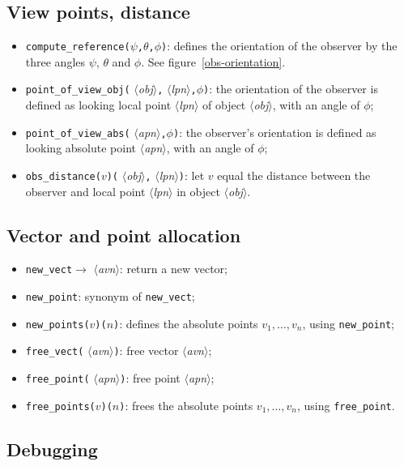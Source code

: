 \documentclass[nonumber,harvardcite]{ltugboat}
\DeclareRobustCommand\meta[1]{%
       \ensuremath{\langle}\emph{#1}\ensuremath{\rangle}}
\newcommand{\AVN}{\meta{avn}}
\newcommand{\APN}{\meta{apn}}
\newcommand{\LPN}{\meta{lpn}}
\newcommand{\IN}{\meta{obj}}
\newcommand{\tc}{\texttt{,}}
\begin{document}
\break

\subsection{View points, distance}

\begin{itemize}
\item \verb|compute_reference(|$\psi$\tc$\theta$\tc$\phi$\verb|)|: defines
the orientation of the observer by the three angles $\psi$, 
$\theta$ and $\phi$. See figure~\ref{obs-orientation}.

\item \verb|point_of_view_obj(|\IN\tc\LPN\tc$\phi$\verb|)|: the orientation 
of the observer is defined as looking local point \LPN{} of object \IN,
with an angle of $\phi$;
\item \verb|point_of_view_abs(|\APN\tc$\phi$\verb|)|: the observer's 
orientation is defined as looking absolute point \APN{},
with an angle of $\phi$;
\item \verb|obs_distance(|$v$\verb|)(|\IN\tc\LPN\verb|)|: let $v$ equal
the distance between the observer and local point \LPN{} in object \IN{}.
\end{itemize}

\subsection{Vector and point allocation}

\begin{itemize}
\item \verb|new_vect|$\rightarrow $ \AVN{}: return a new vector;
\item \verb|new_point|: synonym of \verb|new_vect|;
\item \verb|new_points(|$v$\verb|)(|$n$\verb|)|: defines the absolute points
   $v_1, \ldots, v_n$, using \verb|new_point|; 
\item \verb|free_vect(|\AVN\verb|)|: free vector \AVN;
\item \verb|free_point(|\APN\verb|)|: free point \APN;
\item \verb|free_points(|$v$\verb|)(|$n$\verb|)|: frees the absolute points
   $v_1, \ldots, v_n$, using \verb|free_point|.
\end{itemize}

\subsection{Debugging}
\end{document}
